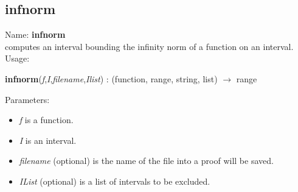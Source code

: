 \subsection{infnorm}
\label{labinfnorm}
\noindent Name: \textbf{infnorm}\\
computes an interval bounding the infinity norm of a function on an interval.\\
\noindent Usage: 
\begin{center}
\textbf{infnorm}(\emph{f},\emph{I},\emph{filename},\emph{Ilist}) : (\textsf{function}, \textsf{range}, \textsf{string}, \textsf{list}) $\rightarrow$ \textsf{range}\\
\end{center}
Parameters: 
\begin{itemize}
\item \emph{f} is a function.
\item \emph{I} is an interval.
\item \emph{filename} (optional) is the name of the file into a proof will be saved.
\item \emph{IList} (optional) is a list of intervals to be excluded.
\end{itemize}
